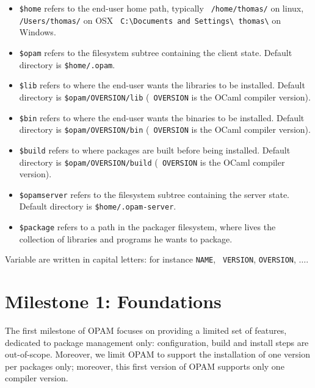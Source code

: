 \documentclass[a4paper,11pt]{article}
\begin{document}
\begin{itemize}

\item {\tt \$home} refers to the end-user home path, typically {\tt
  /home/thomas/} on linux, {\tt /Users/thomas/} on OSX {\tt
  C:\textbackslash Documents and Settings\textbackslash
  thomas\textbackslash} on Windows.

\item {\tt \$opam} refers to the filesystem subtree containing the
  client state. Default directory is {\tt \$home/.opam}.

\item {\tt \$lib} refers to where the end-user wants the libraries to
  be installed. Default directory is {\tt \$opam/OVERSION/lib} ({\tt
    OVERSION} is the OCaml compiler version).

\item {\tt \$bin} refers to where the end-user wants the binaries to
  be installed. Default directory is {\tt \$opam/OVERSION/bin} ({\tt
    OVERSION} is the OCaml compiler version).

\item {\tt \$build} refers to where packages are built before being
  installed. Default directory is {\tt \$opam/OVERSION/build} ({\tt
    OVERSION} is the OCaml compiler version).

\item {\tt \$opamserver} refers to the filesystem subtree containing
  the server state. Default directory is {\tt \$home/.opam-server}.

\item {\tt \$package} refers to a path in the packager filesystem, where
  lives the collection of libraries and programs he wants to package.

\end{itemize}

Variable are written in capital letters: for instance {\tt NAME}, {\tt
  VERSION}, {\tt OVERSION}, $\ldots$.

\section{Milestone 1: Foundations}

The first milestone of OPAM focuses on providing a limited set of
features, dedicated to package management only: configuration, build
and install steps are out-of-scope. Moreover, we limit OPAM to support
the installation of one version per packages only; moreover, this
first version of OPAM supports only one compiler version.
\end{document}

